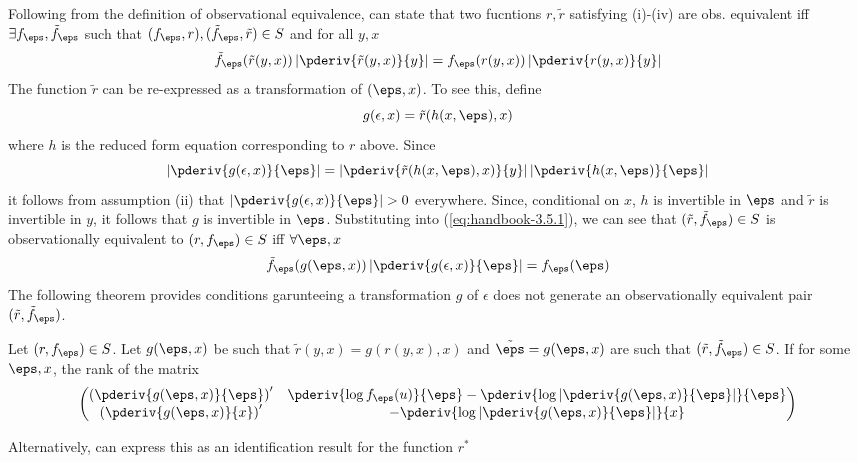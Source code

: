 Following from the definition of observational equivalence, can state that two fucntions $r, \tilde{r}$ satisfying (i)-(iv) are obs. equivalent iff $\exists f_\eps, \tilde{f}_\eps$ such that $(f_\eps, r), (\tilde{f}_\eps, \tilde{r}) \in S$ and for all $y,x$
\begin{equation}
  \label{eq:handbook-3.5.1}
  \tilde{f}_\eps(\tilde{r}(y,x)) \left| \pderiv{\tilde{r}(y,x)}{y} \right| = f_\eps(r(y,x)) \left| \pderiv{r(y,x)}{y} \right|
\end{equation}
The function $\tilde{r}$ can be re-expressed as a transformation of $(\eps,x)$. To see this, define 
\[g(\epsilon, x) = \tilde{r}(h(x,\eps), x)\]
where $h$ is the reduced form equation corresponding to $r$ above. Since
\[\left|\pderiv{g(\epsilon, x)}{\eps}\right| = \left|\pderiv{\tilde{r}(h(x,\eps),x)}{y}\right| \left| \pderiv{h(x,\eps)}{\eps}\right|\]
it follows from assumption (ii) that $\left|\pderiv{g(\epsilon, x)}{\eps}\right| > 0$ everywhere. Since, conditional on $x$, $h$ is invertible in $\eps$ and $\tilde{r}$ is invertible in $y$, it follows that $g$ is invertible in $\eps$. Substituting into (\ref{eq:handbook-3.5.1}), we can see that $(\tilde{r}, \tilde{f}_\eps) \in S$ is observationally equivalent to $(r,f_\eps)\in S$ iff $\forall \eps, x$ 
\[\tilde{f}_\eps(g(\eps, x))\left|\pderiv{g(\epsilon, x)}{\eps}\right| = f_\eps(\eps)\]
The following theorem provides conditions garunteeing a transformation $g$ of $\epsilon$ does not generate an observationally equivalent pair $(\tilde{r}, \tilde{f}_\eps)$. 
\begin{theorem}[Matzkin, 2005]
  Let $(r, f_\eps)\in S$. Let $g(\eps,x)$ be such that $\tilde{r}(y,x) = g(r(y,x),x)$ and $\tilde{\eps} = g(\eps,x)$ are such that $(\tilde{r}, \tilde{f}_\eps) \in S$. If for some $\eps, x$, the rank of the matrix 
  \[\begin{pmatrix}
    \left(\pderiv{g(\eps,x)}{\eps}\right)' & \pderiv{\log f_\eps(u)}{\eps} - \pderiv{\log\left|\pderiv{g(\eps,x)}{\eps}\right|}{\eps} \\
    \left(\pderiv{g(\eps,x)}{x}\right)' &  - \pderiv{\log\left|\pderiv{g(\eps,x)}{\eps}\right|}{x}
  \end{pmatrix}\]
\end{theorem}
Alternatively, can express this as an identification result for the function $r^*$
